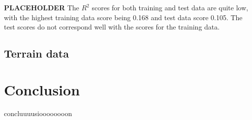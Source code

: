 \documentclass[a4paper, 10pt]{article}
\begin{document}
\begin{multicols}{2}
\textbf{PLACEHOLDER}
The $R^2$ scores for both training and test data are quite low, with the highest training data score being 0.168 and test data score 0.105. The test scores do not correspond well with the scores for the training data.
\subsection{Terrain data}

\section{Conclusion}
concluuuusioooooooon





\end{multicols}
\end{document}
